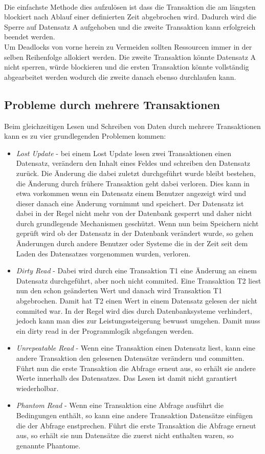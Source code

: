 \\Die einfachste Methode dies aufzulösen ist dass die Transaktion die am längsten blockiert nach Ablauf einer definierten Zeit abgebrochen wird. Dadurch wird die Sperre auf Datensatz A aufgehoben und die zweite Transaktion kann erfolgreich beendet werden.\parencite[S. 139ff]{WeikumVossen02}
\\Um Deadlocks von vorne herein zu Vermeiden sollten Ressourcen immer in der selben Reihenfolge allokiert werden. Die zweite Transaktion könnte Datensatz A nicht sperren, würde blockieren und die ersten Transaktion könnte vollständig abgearbeitet werden wodurch die zweite danach ebenso durchlaufen kann.


\subsection{Probleme durch mehrere Transaktionen}\label{subs:isolation}
Beim gleichzeitigen Lesen und Schreiben von Daten durch mehrere Transaktionen kann es zu vier grundlegenden Problemen kommen:
\begin{itemize}
	\item \emph{Lost Update} - bei einem Lost Update lesen zwei Transaktionen einen Datensatz, verändern den Inhalt eines Feldes und schreiben den Datensatz zurück. Die Änderung die dabei zuletzt durchgeführt wurde bleibt bestehen, die Änderung durch frühere Transaktion geht dabei verloren. Dies kann in etwa vorkommen wenn ein Datensatz einem Benutzer angezeigt wird und dieser danach eine Änderung vornimmt und speichert. Der Datensatz ist dabei in der Regel nicht mehr von der Datenbank gesperrt und daher nicht durch grundlegende Mechanismen geschützt. Wenn nun beim Speichern nicht geprüft wird ob der Datensatz in der Datenbank verändert wurde, so gehen Änderungen durch andere Benutzer oder Systeme die in der Zeit seit dem Laden des Datensatzes vorgenommen wurden, verloren.\parencite[S. 415f]{dbgrund}
	\item \emph{Dirty Read} - Dabei wird durch eine Transaktion T1 eine Änderung an einem Datensatz durchgeführt, aber noch nicht commited. Eine Transaktion T2 liest nun den schon geänderten Wert und danach wird Transaktion T1 abgebrochen. Damit hat T2 einen Wert in einem Datensatz gelesen der nicht commited war. In der Regel wird dies durch Datenbanksysteme verhindert, jedoch kann man dies zur Leistungssteigerung bewusst umgehen. Damit muss ein dirty read in der Programmlogik abgefangen werden.\parencite[S. 439]{dbgrund}
	\item \emph{Unrepeatable Read} - Wenn eine Transaktion einen Datensatz liest, kann eine andere Transaktion den gelesenen Datensätze verändern und committen. Führt nun die erste Transaktion die Abfrage erneut aus, so erhält sie andere Werte innerhalb des Datensatzes. Das Lesen ist damit nicht garantiert wiederholbar.\parencite[S. 439]{dbgrund}
	\item \emph{Phantom Read} - Wenn eine Transaktion eine Abfrage ausführt die Bedingungen enthält, so kann eine andere Transaktion Datensätze einfügen die der Abfrage enstprechen. Führt die erste Transaktion die Abfrage erneut aus, so erhält sie nun Datensätze die zuerst nicht enthalten waren, so genannte Phantome.\parencite[S. 439]{dbgrund}	
\end{itemize}
